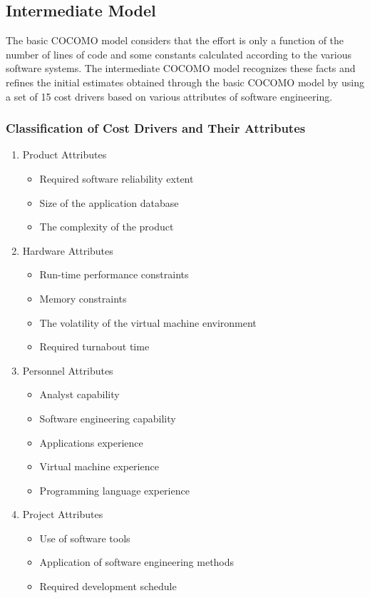 \subsection{Intermediate Model}
The basic COCOMO model considers that the effort is only a function of the number of lines of code and some constants calculated according to the various software systems. The intermediate COCOMO model recognizes these facts and refines the initial estimates obtained through the basic COCOMO model by using a set of 15 cost drivers based on various attributes of software engineering.

\subsubsection{Classification of Cost Drivers and Their Attributes}

\begin{enumerate}
 \item Product Attributes
 \begin{itemize}
  \item Required software reliability extent
  \item Size of the application database
  \item The complexity of the product
 \end{itemize}

 \item Hardware Attributes
 \begin{itemize}
  \item Run-time performance constraints
  \item Memory constraints
  \item The volatility of the virtual machine environment
  \item Required turnabout time
 \end{itemize}

 \item Personnel Attributes
 \begin{itemize}
  \item Analyst capability
  \item Software engineering capability
  \item Applications experience
  \item Virtual machine experience
  \item Programming language experience
 \end{itemize}

 \item Project Attributes
 \begin{itemize}
  \item Use of software tools
  \item Application of software engineering methods
  \item Required development schedule
 \end{itemize}
\end{enumerate}


